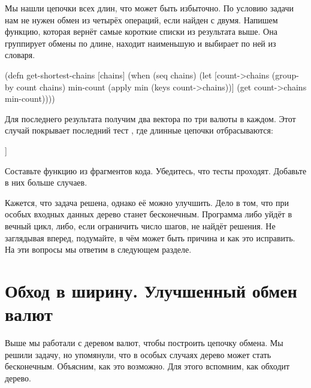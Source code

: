 Мы нашли цепочки всех длин, что может быть избыточно. По условию задачи нам не
нужен обмен из четырёх операций, если найден с двумя. Напишем функцию, которая
вернёт самые короткие списки из результата выше. Она группирует обмены по длине,
находит наименьшую и выбирает по ней из словаря.

\begin{english}
  \begin{clojure}
(defn get-shortest-chains
  [chains]
  (when (seq chains)
    (let [count->chains (group-by count chains)
          min-count (apply min (keys count->chains))]
      (get count->chains min-count))))
  \end{clojure}
\end{english}

Для последнего результата получим два вектора по три валюты в каждом. Этот
случай покрывает последний тест , где длинные цепочки
отбрасываются:

\begin{english}
  \begin{clojure}
[[:usd :rub :yen] [:usd :lir :yen]]
  \end{clojure}
\end{english}

Составьте функцию  из фрагментов кода. Убедитесь, что тесты
проходят. Добавьте в них больше случаев.


Кажется, что задача решена, однако её можно улучшить. Дело в том, что при особых
входных данных дерево станет бесконечным. Программа либо уйдёт в вечный цикл,
либо, если ограничить число шагов, не найдёт решения. Не заглядывая вперед,
подумайте, в чём может быть причина и как это исправить. На эти вопросы мы
ответим в следующем разделе.

\section{Обход в ширину. Улучшенный обмен валют}


Выше мы работали с деревом валют, чтобы построить цепочку обмена. Мы решили
задачу, но упомянули, что в особых случаях дерево может стать
бесконечным. Объясним, как это возможно. Для этого вспомним, как 
обходит дерево.

\def\urldepthfirst{https://en.wikipedia.org/wiki/Depth-first\_search}

